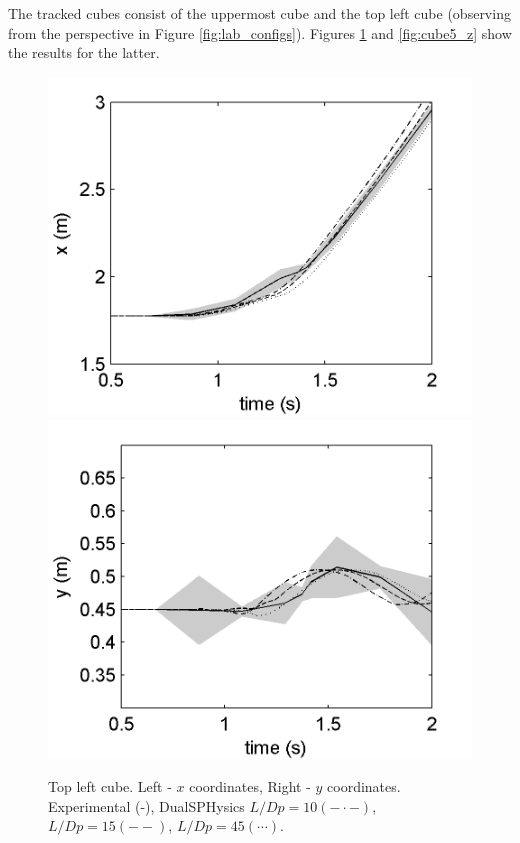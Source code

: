 The tracked cubes consist of the uppermost cube and the top left cube (observing from the perspective in Figure \ref{fig:lab_configs}). Figures \ref{fig:cube5_xy} and \ref{fig:cube5_z} show the results for the latter.
%
\begin{figure}[ht!]
	\centering 
	\includegraphics[width=0.45\linewidth]{Figures/5.Chapter/Fig_8a}
	\includegraphics[width=0.45\linewidth]{Figures/5.Chapter/Fig_8b}
	\caption{Top left cube. Left - $x$ coordinates, Right - $y$ coordinates. Experimental (-), DualSPHysics $L/Dp=10 (- \cdot -)$, $L/Dp=15 (- -)$, $L/Dp=45 (\cdots)$.}
	\label{fig:cube5_xy} 
\end{figure}
%

